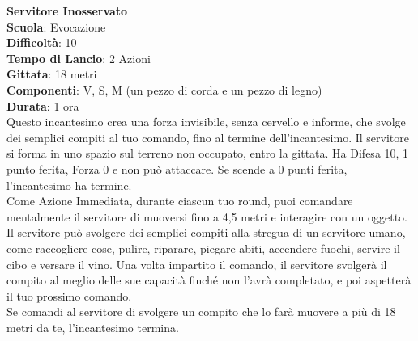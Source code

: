 \begin{multicols}{2}
\medskip\textbf{Servitore Inosservato}\\
\textbf{Scuola}: Evocazione\\
\textbf{Difficoltà}:  10\\
\textbf{Tempo di Lancio}: 2 Azioni\\
\textbf{Gittata}: 18 metri\\
\textbf{Componenti}: V, S, M (un pezzo di corda e un pezzo di legno)\\
\textbf{Durata}: 1 ora\\
Questo incantesimo crea una forza invisibile, senza cervello e informe, che svolge dei semplici compiti al tuo comando, fino al termine dell'incantesimo. Il servitore si forma in uno spazio sul terreno non occupato, entro la gittata. Ha Difesa 10, 1 punto ferita, Forza 0 e non può attaccare. Se scende a 0 punti ferita, l'incantesimo ha termine.\\
Come Azione Immediata, durante ciascun tuo round, puoi comandare mentalmente il servitore di muoversi fino a 4,5 metri e interagire con un oggetto. Il servitore può svolgere dei semplici compiti alla stregua di un servitore umano, come raccogliere cose, pulire, riparare, piegare abiti, accendere fuochi, servire il cibo e versare il vino. Una volta impartito il comando, il servitore svolgerà il compito al meglio delle sue capacità finché non l’avrà  completato, e poi aspetterà il tuo prossimo comando. \\
Se comandi al servitore di svolgere un compito che lo farà muovere a più di 18 metri da te, l'incantesimo termina.


\end{multicols}
